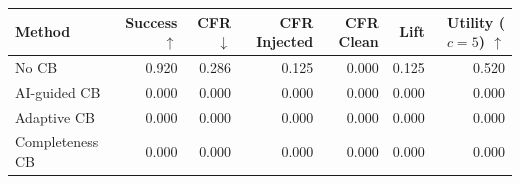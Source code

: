 \begin{tabular}{lrrrrrr}
\toprule
Method & Success $\uparrow$ & CFR $\downarrow$ & CFR Injected & CFR Clean & Lift & Utility ($c=5$) $\uparrow$ \\
\midrule
No CB & 0.920 & 0.286 & 0.125 & 0.000 & 0.125 & 0.520 \\
AI-guided CB & 0.000 & 0.000 & 0.000 & 0.000 & 0.000 & 0.000 \\
Adaptive CB & 0.000 & 0.000 & 0.000 & 0.000 & 0.000 & 0.000 \\
Completeness CB & 0.000 & 0.000 & 0.000 & 0.000 & 0.000 & 0.000 \\
\bottomrule
\end{tabular}
